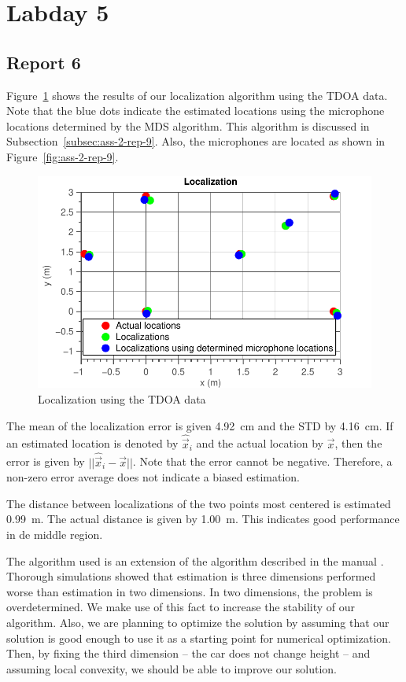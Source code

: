 \documentclass[11pt,titlepage]{report}
\begin{document}
\section{Labday 5}
\subsection{Report 6}
Figure~\ref{fig:ass-2-rep-6} shows the results of our localization algorithm using the TDOA data. Note that the blue dots indicate the estimated locations using the microphone locations determined by the MDS algorithm. This algorithm is discussed in Subsection~\ref{subsec:ass-2-rep-9}. Also, the microphones are located as shown in Figure~\ref{fig:ass-2-rep-9}.

\begin{figure}[H]
	\begin{center}
		\includegraphics[width=.6\linewidth]{../../deliverable-7-resources/figures/ass-2/report-6/ass-2-report-6.pdf}
	\end{center}
	\caption{Localization using the TDOA data}
	\label{fig:ass-2-rep-6}
\end{figure}

The mean of the localization error is given \SI{4.92}{cm} and the STD by \SI{4.16}{cm}. If an estimated location is denoted by $\hat{\vec{x}}_i$ and the actual location by $\vec{x}$, then the error is given by $||\hat{\vec{x}}_i - \vec{x}||$. Note that the error cannot be negative. Therefore, a non-zero error average does not indicate a biased estimation.

The distance between localizations of the two points most centered is estimated \SI{0.99}{m}. The actual distance is given by \SI{1.00}{m}. This indicates good performance in de middle region.

The algorithm used is an extension of the algorithm described in the manual \cite{epo4-manual}. Thorough simulations showed that estimation is three dimensions performed worse than estimation in two dimensions. In two dimensions, the problem is overdetermined. We make use of this fact to increase the stability of our algorithm. Also, we are planning to optimize the solution by assuming that our solution is good enough to use it as a starting point for numerical optimization. Then, by fixing the third dimension -- the car does not change height -- and assuming local convexity, we should be able to improve our solution.
\end{document}
